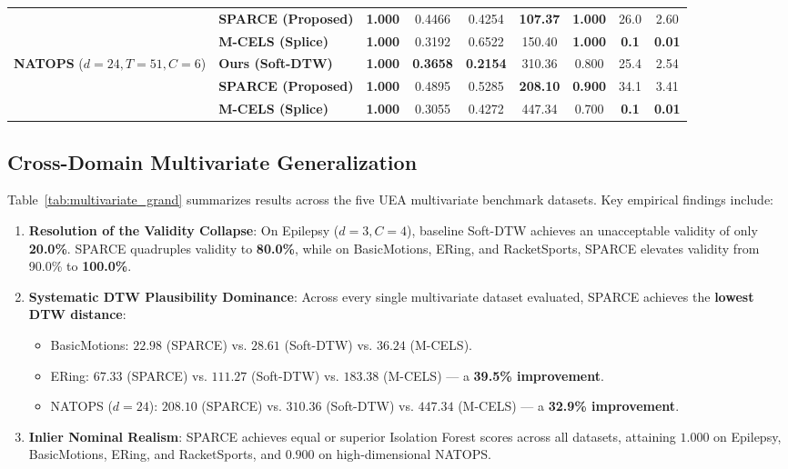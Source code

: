 \documentclass[conference]{IEEEtran}
\begin{document}
\begin{table}[!t]
\begin{tabular}{llccccccc}
& \textbf{SPARCE (Proposed)} & \textbf{1.000} & 0.4466 & 0.4254 & \textbf{107.37} & \textbf{1.000} & 26.0 & 2.60 \\
& \textbf{M-CELS (Splice)} & \textbf{1.000} & 0.3192 & 0.6522 & 150.40 & \textbf{1.000} & \textbf{0.1} & \textbf{0.01} \\
\midrule
\multirow{3}{*}{\textbf{NATOPS} ($d=24, T=51, C=6$)}
& \textbf{Ours (Soft-DTW)} & \textbf{1.000} & \textbf{0.3658} & \textbf{0.2154} & 310.36 & 0.800 & 25.4 & 2.54 \\
& \textbf{SPARCE (Proposed)} & \textbf{1.000} & 0.4895 & 0.5285 & \textbf{208.10} & \textbf{0.900} & 34.1 & 3.41 \\
& \textbf{M-CELS (Splice)} & \textbf{1.000} & 0.3055 & 0.4272 & 447.34 & 0.700 & \textbf{0.1} & \textbf{0.01} \\
\bottomrule
\end{tabular}
\end{table}

\subsection{Cross-Domain Multivariate Generalization}
Table~\ref{tab:multivariate_grand} summarizes results across the five UEA multivariate benchmark datasets.
Key empirical findings include:
\begin{enumerate}
    \item \textbf{Resolution of the Validity Collapse}: On Epilepsy ($d=3, C=4$), baseline Soft-DTW achieves an unacceptable validity of only \textbf{20.0\%}. SPARCE quadruples validity to \textbf{80.0\%}, while on BasicMotions, ERing, and RacketSports, SPARCE elevates validity from 90.0\% to \textbf{100.0\%}.
    \item \textbf{Systematic DTW Plausibility Dominance}: Across every single multivariate dataset evaluated, SPARCE achieves the \textbf{lowest DTW distance}:
    \begin{itemize}
        \item BasicMotions: $22.98$ (SPARCE) vs. $28.61$ (Soft-DTW) vs. $36.24$ (M-CELS).
        \item ERing: \textbf{$67.33$} (SPARCE) vs. $111.27$ (Soft-DTW) vs. $183.38$ (M-CELS) — a \textbf{39.5\% improvement}.
        \item NATOPS ($d=24$): \textbf{$208.10$} (SPARCE) vs. $310.36$ (Soft-DTW) vs. $447.34$ (M-CELS) — a \textbf{32.9\% improvement}.
    \end{itemize}
    \item \textbf{Inlier Nominal Realism}: SPARCE achieves equal or superior Isolation Forest scores across all datasets, attaining $1.000$ on Epilepsy, BasicMotions, ERing, and RacketSports, and $0.900$ on high-dimensional NATOPS.
\end{enumerate}
\end{document}
